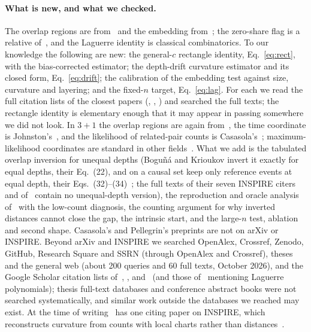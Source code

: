\documentclass[11pt,a4paper]{article}
\begin{document}
\paragraph{What is new, and what we checked.} The overlap regions are from~\cite{BK24} and the embedding from~\cite{CloughEvans16}; the zero-share flag is a relative of~\cite{GlaserSurya13}, and the Laguerre identity is classical combinatorics. To our knowledge the following are new: the general-$c$ rectangle identity, Eq.~\eqref{eq:rect}, with the bias-corrected estimator; the depth-drift curvature estimator and its closed form, Eq.~\eqref{eq:drift}; the calibration of the embedding test against size, curvature and layering; and the fixed-$n$ target, Eq.~\eqref{eq:lag}. For each we read the full citation lists of the closest papers (\cite{BK24}, \cite{CloughEvans16}, \cite{Johnston08,Johnston09}) and searched the full texts; the rectangle identity is elementary enough that it may appear in passing somewhere we did not look. In $3+1$ the overlap regions are again from~\cite{BK24}, the time coordinate is Johnston's~\cite{Johnston25}, and the likelihood of related-pair counts is Casasola's~\cite{Casasola26}; maximum-likelihood coordinates are standard in other fields~\cite{Ramsay77,Hoff02,BPK10,Mercator19,Sim21}. What we add is the tabulated overlap inversion for unequal depths (Bogu\~n\'a and Krioukov invert it exactly for equal depths, their Eq.~(22), and on a causal set keep only reference events at equal depth, their Eqs.~(32)--(34)~\cite{BK24}; the full texts of their seven INSPIRE citers and of~\cite{RideoutWallden09} contain no unequal-depth version), the reproduction and oracle analysis of~\cite{Johnston25} with the low-count diagnosis, the counting argument for why inverted distances cannot close the gap, the intrinsic start, and the large-$n$ test, ablation and second shape. Casasola's and Pellegrin's preprints are not on arXiv or INSPIRE. Beyond arXiv and INSPIRE we searched OpenAlex, Crossref, Zenodo, GitHub, Research Square and SSRN (through OpenAlex and Crossref), theses and the general web (about 200 queries and 60 full texts, October 2026), and the Google Scholar citation lists of~\cite{Johnston25}, \cite{BK24}, \cite{CloughEvans16} and~\cite{Casasola26} (and those of~\cite{Johnston08} mentioning Laguerre polynomials); thesis full-text databases and conference abstract books were not searched systematically, and similar work outside the databases we reached may exist. At the time of writing~\cite{Johnston25} has one citing paper on INSPIRE, which reconstructs curvature from counts with local charts rather than distances~\cite{Madsen26}.
\end{document}
